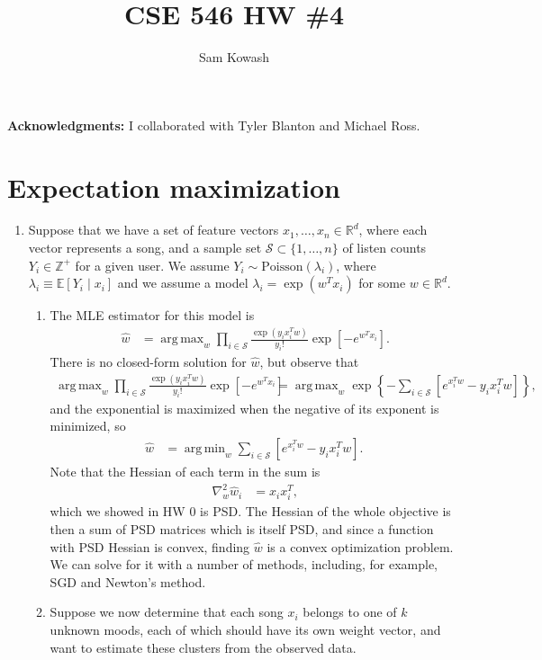 \documentclass[11pt,letterpaper]{article}
\author{Sam Kowash}
\title{CSE 546 HW \#4}
\DeclareMathOperator*{\argmin}{arg\,min}
\DeclareMathOperator*{\argmax}{arg\,max}
\newcommand{\R}{\mathbb{R}}
\theoremstyle{definition}
\theoremstyle{plain}
\numberwithin{equation}{section}
\numberwithin{figure}{section}
\begin{document}
\maketitle

{\bf Acknowledgments:} I collaborated with Tyler Blanton and Michael Ross.

\section{Expectation maximization}
\begin{enumerate}
	\item Suppose that we have a set of feature vectors $x_1, \ldots, x_n \in \R^d$, where each vector represents a song, and a sample set $\mathcal{S} \subset \{1,\ldots,n\}$ of listen counts $Y_i \in \mathbb{Z}^+$ for a given user. We assume $Y_i \sim \mathrm{Poisson}(\lambda_i)$, where $\lambda_i \equiv \mathbb{E}[Y_i \mid x_i]$ and we assume a model $\lambda_i = \exp(w^T x_i)$ for some $w \in \R^d$.

	\begin{enumerate}
		\item The MLE estimator for this model is
		\begin{align*}
			\hat{w} &= \argmax_w \prod_{i \in \mathcal{S}} \frac{\exp(y_i x_i^T w)}{y_i!} \exp\left[-e^{w^T x_i}\right].
		\end{align*}
		There is no closed-form solution for $\hat{w}$, but observe that
		\begin{align*}
			\argmax_w \prod_{i \in \mathcal{S}} \frac{\exp(y_i x_i^T w)}{y_i!} \exp\left[-e^{w^T x_i}\right] &= \argmax_w \exp\left\{-\sum_{i\in\mathcal{S}}\left[e^{x_i^T w} - y_i x_i^T w\right]\right\},
		\end{align*}
		and the exponential is maximized when the negative of its exponent is minimized, so
		\begin{align*}
			\hat{w} &= \argmin_w \sum_{i\in\mathcal{S}}\left[e^{x_i^T w} - y_i x_i^T w\right]. \
		\end{align*}
		Note that the Hessian of each term in the sum is
		\begin{align*}
			\nabla^2_w \hat{w}_i &= x_i x_i^T,
		\end{align*}
		which we showed in HW 0 is PSD. The Hessian of the whole objective is then a sum of PSD matrices which is itself PSD, and since a function with PSD Hessian is convex, finding $\hat{w}$ is a convex optimization problem. We can solve for it with a number of methods, including, for example, SGD and Newton's method.



		\item Suppose we now determine that each song $x_i$ belongs to one of $k$ unknown moods, each of which should have its own weight vector, and want to estimate these clusters from the observed data.



	\end{enumerate}
\end{enumerate}
\end{document}
